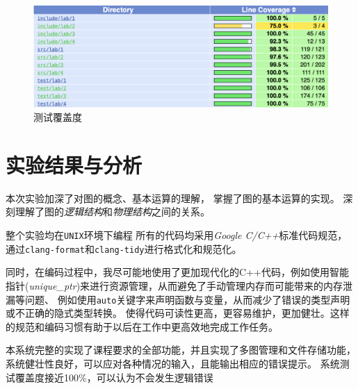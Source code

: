 \begin{figure}
\centering
\caption{测试覆盖度}\label{fig:cov4}
\includegraphics[scale=.5]{cov.png}
\end{figure}

\section{实验结果与分析}\label{sec:test44}
本次实验加深了对图的概念、基本运算的理解，
掌握了图的基本运算的实现。
深刻理解了图的\emph{逻辑结构}和\emph{物理结构}之间的关系。
\par 整个实验均在\texttt{UNIX}环境下编程
所有的代码均采用\emph{Google C/C++}标准代码规范，
通过\texttt{clang-format}和\texttt{clang-tidy}进行格式化和规范化。
\par
同时，在编码过程中，我尽可能地使用了更加现代化的C++代码，例如使用智能指针(\textit{unique\_ptr})来进行资源管理，从而避免了手动管理内存而可能带来的内存泄漏等问题、
例如使用\texttt{auto}关键字来声明函数与变量，从而减少了错误的类型声明或不正确的隐式类型转换。
使得代码可读性更高，更容易维护，更加健壮。这样的规范和编码习惯有助于以后在工作中更高效地完成工作任务。
\par
本系统完整的实现了课程要求的全部功能，并且实现了多图管理和文件存储功能，
系统健壮性良好，可以应对各种情况的输入，且能输出相应的错误提示。
系统测试覆盖度接近100\%，可以认为不会发生逻辑错误
\par

